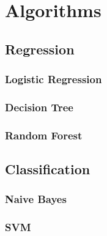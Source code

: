 \chapter{Algorithms}

\section{Regression}

\subsection{Logistic Regression}

\subsection{Decision Tree}

\subsection{Random Forest}





\section{Classification}

\subsection{Naive Bayes}

\subsection{SVM}